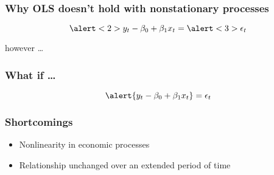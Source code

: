 \documentclass{beamer}
\begin{document}
\begin{frame}[t]\frametitle[Why not OLS?]{Why OLS doesn't hold with nonstationary processes}
  
  \begin{center}
    \alert{
    } 
  \end{center}
  
  \begin{equation*}
    \alert<2>{y_t -\beta_0 + \beta_1 x_t} = \alert<3>{\epsilon_t}
  \end{equation*}
\end{frame}


\begin{frame}
  \begin{center}
    {\Large however \dots}
  \end{center}
\end{frame}

\begin{frame}[t]\frametitle{What if \dots}
  \begin{equation*}
    \alert{y_t -\beta_0 + \beta_1 x_t} = \epsilon_t
  \end{equation*}
\end{frame}

\begin{frame}[c]\frametitle{Shortcomings}
    \begin{itemize}
      \item<1-> Nonlinearity in economic processes
      \item<3-> Relationship unchanged over an extended period of time
    \end{itemize}
    
\end{frame}
\end{document}
